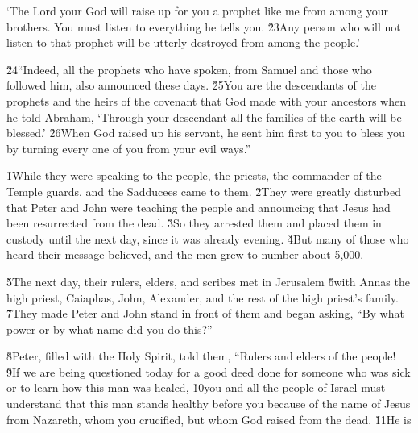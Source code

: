 `The Lord your God will raise up for you a prophet like me from among your brothers. You must listen to everything he tells you. \v{23}Any person who will not listen to that prophet will be utterly destroyed from among the people.'

\v{24}``Indeed, all the prophets who have spoken, from Samuel and those who followed him, also announced these days. \v{25}You are the descendants of the prophets and the heirs of the covenant that God made with your ancestors when he told Abraham, `Through your descendant all the families of the earth will be blessed.' \v{26}When God raised up his servant, he sent him first to you to bless you by turning every one of you from your evil ways.''

\v{1}While they were speaking to the people, the priests, the commander of the Temple guards, and the Sadducees came to them. \v{2}They were greatly disturbed that Peter and John were teaching the people and announcing that Jesus had been resurrected from the dead. \v{3}So they arrested them and placed them in custody until the next day, since it was already evening. \v{4}But many of those who heard their message believed, and the men grew to number about 5,000.

\v{5}The next day, their rulers, elders, and scribes met in Jerusalem \v{6}with Annas the high priest, Caiaphas, John, Alexander, and the rest of the high priest's family. \v{7}They made Peter and John stand in front of them and began asking, ``By what power or by what name did you do this?''

\v{8}Peter, filled with the Holy Spirit, told them, ``Rulers and elders of the people! \v{9}If we are being questioned today for a good deed done for someone who was sick or to learn how this man was healed, \v{10}you and all the people of Israel must understand that this man stands healthy before you because of the name of Jesus from Nazareth, whom you crucified, but whom God raised from the dead. \v{11}He is

